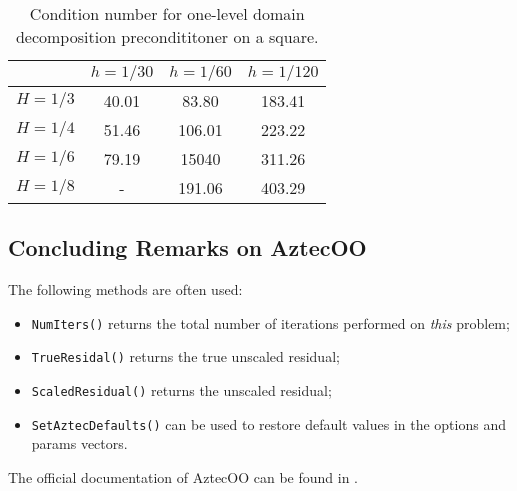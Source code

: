 \begin{table}[htbp]
  \centering
  \begin{tabular}{| c | c c c |}
    \hline
    & $h=1/30$ & $h=1/60$ & $h=1/120$ \\
    \hline
    $H=1/3$ & 40.01 & 83.80 & 183.41 \\
    $H=1/4$ & 51.46 & 106.01 & 223.22 \\
    $H=1/6$ & 79.19 & 15040 & 311.26 \\
    $H=1/8$ & -     & 191.06 & 403.29 \\
    \hline
  \end{tabular}
  \caption{Condition number for one-level domain decomposition precondititoner on a square.}
  \label{tab:aztec:dd}
\end{table}

\subsection{Concluding Remarks on AztecOO}

The following methods are often used:
\begin{itemize}
\item \verb!NumIters()! returns the total number of iterations performed
  on {\sl this} problem;
\item \verb!TrueResidal()! returns the true unscaled residual;
\item \verb!ScaledResidual()! returns the unscaled residual;
\item \verb!SetAztecDefaults()! can be used to restore default values in
  the options and params vectors.
\end{itemize}

The official documentation of AztecOO can be found in
\cite{AztecOO-Users-Guide}.

